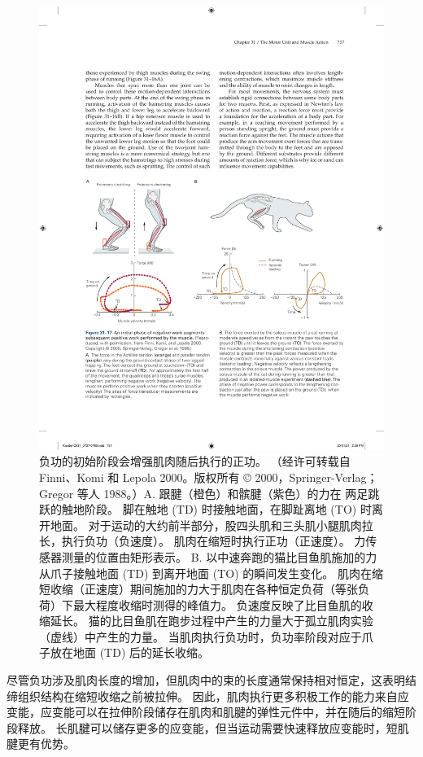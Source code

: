 \begin{figure}[htbp]
	\centering
	\includegraphics[width=0.9\linewidth]{chap31/fig_31_17}
	\caption{负功的初始阶段会增强肌肉随后执行的正功。 （经许可转载自 Finni、Komi 和 Lepola 2000。版权所有 © 2000，Springer-Verlag；Gregor 等人 1988。）A. 跟腱（橙色）和髌腱（紫色）的力在 两足跳跃的触地阶段。 脚在触地 (TD) 时接触地面，在脚趾离地 (TO) 时离开地面。 对于运动的大约前半部分，股四头肌和三头肌小腿肌肉拉长，执行负功（负速度）。 肌肉在缩短时执行正功（正速度）。 力传感器测量的位置由矩形表示。 B. 以中速奔跑的猫比目鱼肌施加的力从爪子接触地面 (TD) 到离开地面 (TO) 的瞬间发生变化。 肌肉在缩短收缩（正速度）期间施加的力大于肌肉在各种恒定负荷（等张负荷）下最大程度收缩时测得的峰值力。 负速度反映了比目鱼肌的收缩延长。 猫的比目鱼肌在跑步过程中产生的力量大于孤立肌肉实验（虚线）中产生的力量。 当肌肉执行负功时，负功率阶段对应于爪子放在地面 (TD) 后的延长收缩。}
	\label{fig:31_17}
\end{figure}

尽管负功涉及肌肉长度的增加，但肌肉中的束的长度通常保持相对恒定，这表明结缔组织结构在缩短收缩之前被拉伸。
因此，肌肉执行更多积极工作的能力来自应变能，应变能可以在拉伸阶段储存在肌肉和肌腱的弹性元件中，并在随后的缩短阶段释放。
长肌腱可以储存更多的应变能，但当运动需要快速释放应变能时，短肌腱更有优势。


